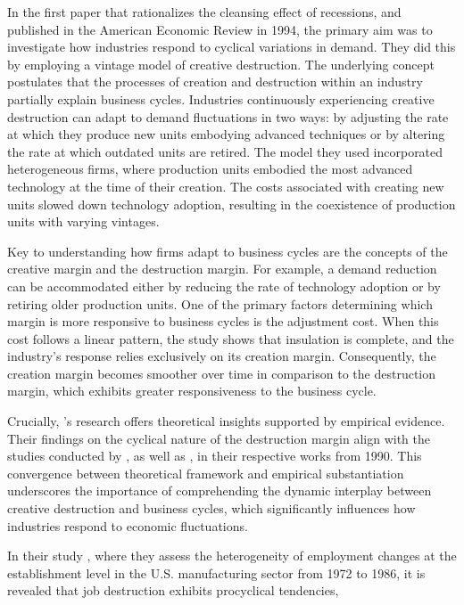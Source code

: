 \documentclass[12pt]{report}
\begin{document}
In the first paper that rationalizes the cleansing effect of recessions, \cite{CabHarm94} and published in the American
Economic Review in 1994, the primary aim was to investigate how
industries respond to cyclical variations in demand. They did this by employing a vintage model of creative destruction.
The underlying concept postulates that the processes of creation and destruction within an industry partially explain
business cycles. Industries continuously experiencing creative destruction can adapt to demand fluctuations in two
ways: by adjusting the rate at which they produce new units embodying advanced techniques or by altering the
rate at which outdated units are retired. The model they used incorporated heterogeneous firms, where production units
embodied the most advanced technology at the time of their creation. The costs associated with creating new units
slowed down technology adoption, resulting in the coexistence of production units with varying vintages.
\par
Key to understanding how firms adapt to business cycles are the concepts of the creative margin and the destruction
margin. For example, a demand reduction can be accommodated either by reducing the rate of technology adoption or by
retiring older production units. One of the primary factors determining which margin is more responsive to business
cycles is the adjustment cost. When this cost follows a linear pattern, the study shows that insulation is complete, and
the industry's response relies exclusively on its creation margin. Consequently, the creation margin becomes smoother
over time in comparison to the destruction margin, which exhibits greater responsiveness to the business cycle.
\par
Crucially, \cite{CabHarm94}'s research \cite{BlaDia90} offers theoretical insights supported by empirical
evidence. Their findings on the cyclical nature of the destruction margin align with the studies conducted by \cite{BlaDia90}, as well as \cite{DavHalt92}, in their respective works
from 1990. This
convergence between theoretical framework and empirical substantiation underscores the importance of comprehending the
dynamic interplay between creative destruction and business cycles, which significantly influences how industries
respond to economic fluctuations.
\par
In their study \cite{DavHalt92}, where they assess the heterogeneity of employment changes at the establishment level in
the U.S. manufacturing sector from 1972 to 1986, it is revealed that job destruction exhibits procyclical tendencies,
\end{document}
